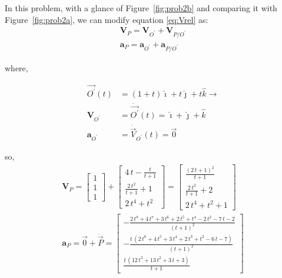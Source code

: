 \documentclass[conference]{IEEEtran}
\begin{document}
In this problem, with a glance of Figure~\ref{fig:prob2b} and comparing it with Figure~\ref{fig:prob2a}, we can modify equation \ref{eq:Vrel} as:
\begin{gather}
    \mathbf{V}_P = \mathbf{V}_{O^\prime} + \mathbf{V}_{P/O^\prime} \\
    \mathbf{a}_P = \mathbf{a}_{O^\prime} + \mathbf{a}_{P/O^\prime}
\end{gather}

where,

\begin{align*}
    \vec{O^\prime}(t)     & = (1+t) \hat{\imath} + t \hat{\jmath} + t \hat{k} \longrightarrow \\
    \mathbf{V}_{O^\prime} & = \dot{\vec{O^\prime}}(t) = \hat{\imath} + \hat{\jmath} + \hat{k} \\
    \mathbf{a}_{O^\prime} & = \dot{\vec{V}}_{O^\prime}(t) = \vec{0}
\end{align*}

so,
\begin{gather}
    \mathbf{V}_P = \begin{bmatrix}
        1 \\
        1 \\
        1
    \end{bmatrix} + \begin{bmatrix}
        4\,t-\frac{t}{t+1} \\ \frac{2\,t^2}{t+1}+1\\ 2\,t^4+t^2
    \end{bmatrix} = \begin{bmatrix}
        \frac{{\left(2\,t+1\right)}^2}{t+1} \\[10px]
        \frac{2\,t^2}{t+1}+2                \\[10px]
        2\,t^4+t^2+1
    \end{bmatrix}                                                                                          \\[5px]
    \mathbf{a}_P = \vec{0} + \ddot{\vec{P}} = \begin{bmatrix}
        -\frac{2\,t^8+4\,t^7+3\,t^6+2\,t^5+t^4-2\,t^2-7\,t-2}{{\left(t+1\right)}^2}          \\[10px]
        -\frac{t\,\left(2\,t^6+4\,t^5+3\,t^4+2\,t^3+t^2-6\,t-7\right)}{{\left(t+1\right)}^2} \\[10px]
        \frac{t\,\left(12\,t^3+13\,t^2+3\,t+3\right)}{t+1}
    \end{bmatrix}
\end{gather}
\end{document}
